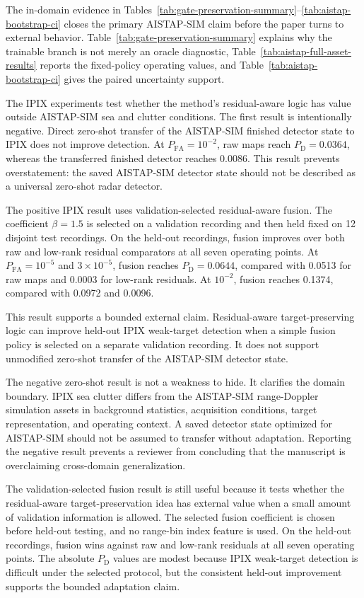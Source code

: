 \documentclass[journal]{IEEEtran}
\begin{document}
The in-domain evidence in Tables~\ref{tab:gate-preservation-summary}--\ref{tab:aistap-bootstrap-ci} closes the primary AISTAP-SIM claim before the paper turns to external behavior. Table~\ref{tab:gate-preservation-summary} explains why the trainable branch is not merely an oracle diagnostic, Table~\ref{tab:aistap-full-asset-results} reports the fixed-policy operating values, and Table~\ref{tab:aistap-bootstrap-ci} gives the paired uncertainty support.

The IPIX experiments test whether the method's residual-aware logic has value outside AISTAP-SIM sea and clutter conditions. The first result is intentionally negative. Direct zero-shot transfer of the AISTAP-SIM finished detector state to IPIX does not improve detection. At $P_{\mathrm{FA}}=10^{-2}$, raw maps reach $P_{\mathrm{D}}=0.0364$, whereas the transferred finished detector reaches 0.0086. This result prevents overstatement: the saved AISTAP-SIM detector state should not be described as a universal zero-shot radar detector.

The positive IPIX result uses validation-selected residual-aware fusion. The coefficient $\beta=1.5$ is selected on a validation recording and then held fixed on 12 disjoint test recordings. On the held-out recordings, fusion improves over both raw and low-rank residual comparators at all seven operating points. At $P_{\mathrm{FA}}=10^{-5}$ and $3 \times 10^{-5}$, fusion reaches $P_{\mathrm{D}}=0.0644$, compared with 0.0513 for raw maps and 0.0003 for low-rank residuals. At $10^{-2}$, fusion reaches 0.1374, compared with 0.0972 and 0.0096.

This result supports a bounded external claim. Residual-aware target-preserving logic can improve held-out IPIX weak-target detection when a simple fusion policy is selected on a separate validation recording. It does not support unmodified zero-shot transfer of the AISTAP-SIM detector state.

The negative zero-shot result is not a weakness to hide. It clarifies the domain boundary. IPIX sea clutter differs from the AISTAP-SIM range-Doppler simulation assets in background statistics, acquisition conditions, target representation, and operating context. A saved detector state optimized for AISTAP-SIM should not be assumed to transfer without adaptation. Reporting the negative result prevents a reviewer from concluding that the manuscript is overclaiming cross-domain generalization.

The validation-selected fusion result is still useful because it tests whether the residual-aware target-preservation idea has external value when a small amount of validation information is allowed. The selected fusion coefficient is chosen before held-out testing, and no range-bin index feature is used. On the held-out recordings, fusion wins against raw and low-rank residuals at all seven operating points. The absolute $P_{\mathrm{D}}$ values are modest because IPIX weak-target detection is difficult under the selected protocol, but the consistent held-out improvement supports the bounded adaptation claim.
\end{document}
